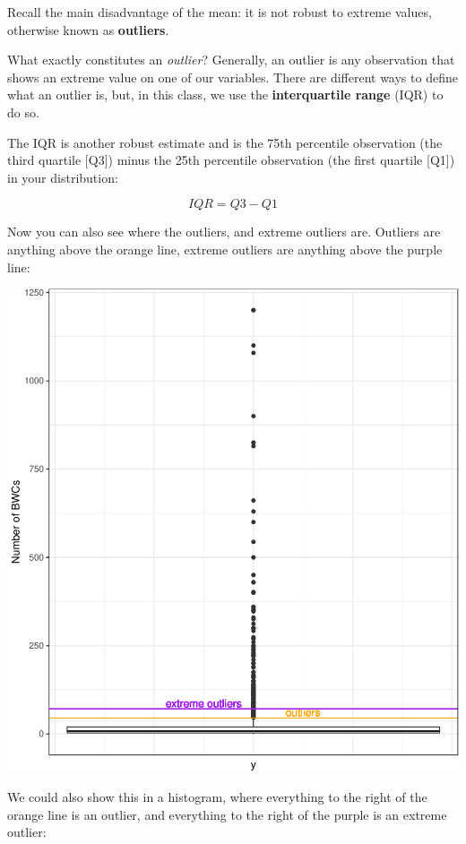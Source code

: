 \documentclass[
]{book}
\begin{document}
Recall the main disadvantage of the mean: it is not robust to extreme values, otherwise known as \textbf{outliers}.

What exactly constitutes an \emph{outlier}? Generally, an outlier is any observation that shows an extreme value on one of our variables. There are different ways to define what an outlier is, but, in this class, we use the \textbf{interquartile range} (IQR) to do so.

The IQR is another robust estimate and is the 75th percentile observation (the third quartile {[}Q3{]}) minus the 25th percentile observation (the first quartile {[}Q1{]}) in your distribution:

\[ IQR= Q3 - Q1 \]

Now you can also see where the outliers, and extreme outliers are. Outliers are anything above the orange line, extreme outliers are anything above the purple line:

\includegraphics{04-descriptive-statistics_files/figure-latex/unnamed-chunk-29-1.pdf}

We could also show this in a histogram, where everything to the right of the orange line is an outlier, and everything to the right of the purple is an extreme outlier:
\end{document}
